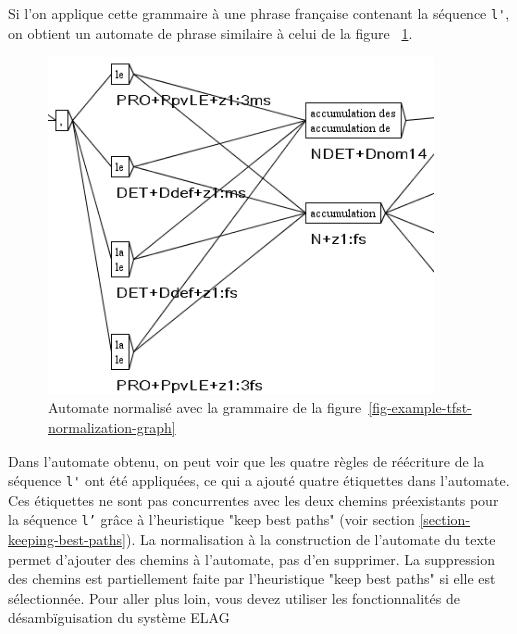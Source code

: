 \bigskip
\noindent Si l’on applique cette grammaire à une phrase française contenant la séquence
\verb+l'+, on obtient un automate de phrase similaire à celui de la figure ~\ref{fig-tfst-normalization-results}.

\begin{figure}[!ht]
\begin{center}
\includegraphics[width=10.2cm]{resources/img/fig7-5.png}
\caption{Automate normalisé avec la grammaire de la figure~\ref{fig-example-tfst-normalization-graph}
\label{fig-tfst-normalization-results}}
\end{center}
\end{figure}

\bigskip
\noindent Dans l’automate obtenu, on peut voir que les quatre règles de réécriture de la séquence
\verb+l'+ ont été appliquées, ce qui a ajouté quatre étiquettes dans l’automate.
Ces étiquettes ne sont pas concurrentes avec les deux chemins préexistants pour la séquence
\verb+l’+ grâce à l'heuristique "keep best paths" (voir section \ref{section-keeping-best-paths}).
La normalisation à la construction de l’automate du texte permet d’ajouter des chemins à l’automate,
pas d’en supprimer.
La suppression des chemins est partiellement faite par l'heuristique "keep best paths" si elle est
sélectionnée. Pour aller plus loin, vous devez utiliser les fonctionnalités de désambïguisation du
système ELAG

